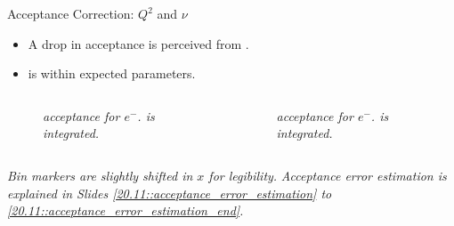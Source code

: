 \begin{frame}{Acceptance Correction: $Q^2$ and $\nu$}
    \label{11.52::electron_variables}

    \begin{itemize}
        \item
            A drop in  acceptance is perceived from .

        \item
            \efe{$\nu$} is within expected parameters.
    \end{itemize}

    \vspace{-12pt}
    \begin{columns}[onlytextwidth,T]

    \begin{column}{.49\linewidth}
        \begin{center}
            \begin{figure}[t]
                \scriptsize{\textit{
                     acceptance for $e^-$.
                    \ef{$\nu$} is integrated.
                }}
            \end{figure}
        \end{center}
    \end{column}

    \begin{column}{.49\linewidth}
        \begin{center}
            \begin{figure}[t]
                \scriptsize{\textit{
                    \ef{$\nu$} acceptance for $e^-$.
                     is integrated.
                }}
            \end{figure}
        \end{center}
    \end{column}

    \end{columns}

    \begin{flushright}
        \tiny{\textit{Bin markers are slightly shifted in $x$ for legibility.}}
        \tiny{\textit{Acceptance error estimation is explained in Slides \textcolor{efd_purple}{\ref{20.11::acceptance_error_estimation}} to \textcolor{efd_purple}{\ref{20.11::acceptance_error_estimation_end}}.}}
    \end{flushright}
\end{frame}

